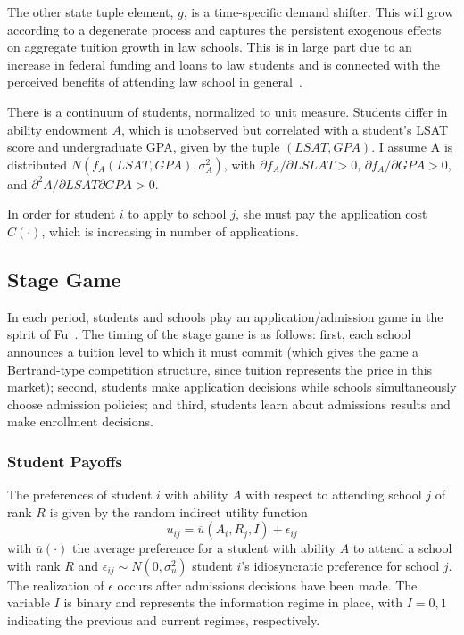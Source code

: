 \documentclass[12pt]{article}
\theoremstyle{definition}
\begin{document}
The other state tuple element, $g$, is a time-specific demand shifter. This will grow according to a degenerate process and captures the persistent exogenous effects on aggregate tuition growth in law schools. This is in large part due to an increase in federal funding and loans to law students and is connected with the perceived benefits of attending law school in general~\cite{nyt_debt_crisis}.

There is a continuum of students, normalized to unit measure. Students differ in ability endowment $A$, which is unobserved but correlated with a student's LSAT score and undergraduate GPA, given by the tuple $(LSAT, GPA)$. I assume A is distributed $N(f_A(LSAT, GPA), \sigma_A^2)$, with $\partial f_A / \partial LSLAT > 0$, $\partial f_A / \partial GPA > 0$, and $\partial^2 A / \partial LSAT \partial GPA > 0$.

In order for student $i$ to apply to school $j$, she must pay the application cost $C(\cdot)$, which is increasing in number of applications.

\subsection{Stage Game}
\label{sec:stage_game}

In each period, students and schools play an application/admission game in the spirit of Fu~\cite{Fu}. The timing of the stage game is as follows: first, each school announces a tuition level to which it must commit (which gives the game a Bertrand-type competition structure, since tuition represents the price in this market); second, students make application decisions while schools simultaneously choose admission policies; and third, students learn about admissions results and make enrollment decisions.

\subsubsection{Student Payoffs}
\label{sec:student_payoffs}

The preferences of student $i$ with ability $A$ with respect to attending school $j$ of rank $R$ is given by the random indirect utility function
\begin{equation}
  u_{ij} = \overline{u}(A_i, R_j, I) + \epsilon_{ij}
  \label{eq:student_preference}
\end{equation}
with $\overline{u}(\cdot)$ the average preference for a student with ability $A$ to attend a school with rank $R$ and $\epsilon_{ij}\sim N(0, \sigma^2_u)$ student $i$'s idiosyncratic preference for school $j$. The realization of $\epsilon$ occurs after admissions decisions have been made. The variable $I$ is binary and represents the information regime in place, with $I=0, 1$ indicating the previous and current regimes, respectively.
\end{document}
